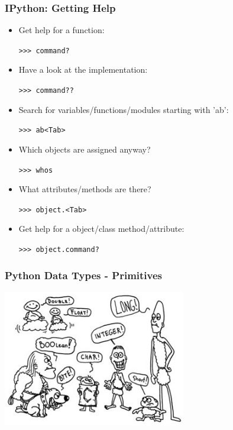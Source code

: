 \documentclass[t,10pt,compress=false,usepdftitle=false]{beamer}
\begin{document}
\begin{frame}[fragile]
    \frametitle{IPython: Getting Help}
    \begin{itemize}
    \item Get help for a function:
    \begin{myColorBox}{0.9}{} \verb#>>> command?#\end{myColorBox}
    \item Have a look at the implementation:
    \begin{myColorBox}{0.9}{} \verb#>>> command??#\end{myColorBox}
    \item Search for variables/functions/modules starting with 'ab':
    \begin{myColorBox}{0.9}{} \verb#>>> ab<Tab>#\end{myColorBox}
    \item Which objects are assigned anyway? 
    \begin{myColorBox}{0.9}{} \verb#>>> whos#\end{myColorBox}
    \item What attributes/methods are there? 
    \begin{myColorBox}{0.9}{}\verb#>>> object.<Tab>#\end{myColorBox}
    \item Get help for a object/class method/attribute:
    \begin{myColorBox}{0.9}{} \verb#>>> object.command?#\end{myColorBox}
    \end{itemize}
\end{frame}

\begin{frame}[fragile]
    \frametitle{Python Data Types - Primitives}
    \begin{center}
      \includegraphics[width=0.6\textwidth]{data.jpg}
    \end{center}
\end{frame}
\end{document}

